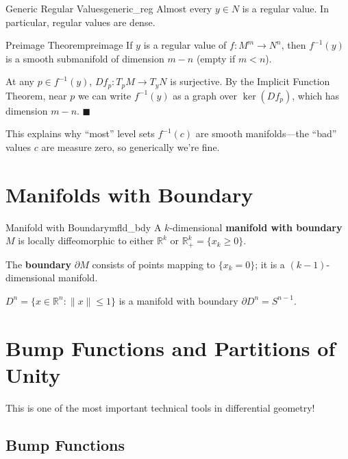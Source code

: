 \documentclass[11pt, letterpaper, openany]{book}
\renewenvironment{proof}[1][\proofname]{%
  \tcolorbox[blanker, breakable, left=1em,
    before skip=1em, after skip=1em,
    borderline west={2pt}{0pt}{MagicTeal!50},
    colback=MagicCream,
    before upper={\textcolor{MagicTeal}{\sffamily\bfseries #1.}\space}
  ]%
}{%
  \hfill\textcolor{MagicTeal}{\ensuremath{\blacksquare}}\endtcolorbox%
}
\begin{document}
\begin{cor}{Generic Regular Values}{generic_reg}
Almost every $y \in N$ is a regular value. In particular, regular values are dense.
\end{cor}

\begin{thm}{Preimage Theorem}{preimage}
If $y$ is a regular value of $f: M^m \to N^n$, then $f^{-1}(y)$ is a smooth submanifold of dimension $m - n$ (empty if $m < n$).
\end{thm}

\begin{proof}
At any $p \in f^{-1}(y)$, $Df_p: T_p M \to T_y N$ is surjective. By the Implicit Function Theorem, near $p$ we can write $f^{-1}(y)$ as a graph over $\ker(Df_p)$, which has dimension $m - n$.
\end{proof}

\begin{remark}
This explains why ``most'' level sets $f^{-1}(c)$ are smooth manifolds---the ``bad'' values $c$ are measure zero, so generically we're fine.
\end{remark}

\section{Manifolds with Boundary}

\begin{defn}{Manifold with Boundary}{mfld_bdy}
A $k$-dimensional \textbf{manifold with boundary} $M$ is locally diffeomorphic to either $\mathbb{R}^k$ or $\mathbb{R}^k_+ = \{x_k \geq 0\}$.

The \textbf{boundary} $\partial M$ consists of points mapping to $\{x_k = 0\}$; it is a $(k-1)$-dimensional manifold.
\end{defn}

\begin{example}
$D^n = \{x \in \mathbb{R}^n : \|x\| \leq 1\}$ is a manifold with boundary $\partial D^n = S^{n-1}$.
\end{example}

\section{Bump Functions and Partitions of Unity}

This is one of the most important technical tools in differential geometry!

\subsection{Bump Functions}
\end{document}
